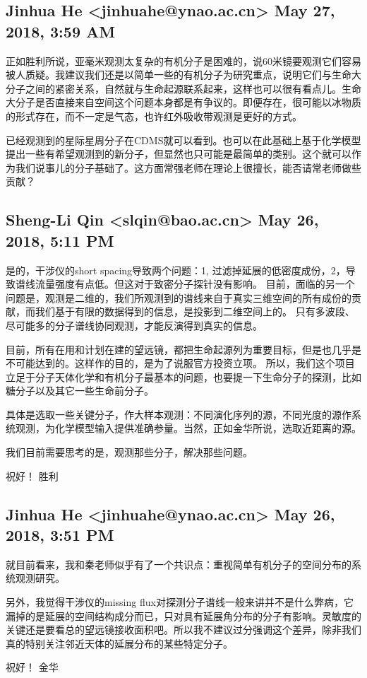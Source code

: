 \documentclass{article}
\newcommand\from[2]{\subsection{{#1} {#2}}}
\newcommand\said[1]{#1}
\begin{document}
\from{
Jinhua He <jinhuahe@ynao.ac.cn>
}{
May 27, 2018, 3:59 AM
}
\said{
正如胜利所说，亚毫米观测太复杂的有机分子是困难的，说60米镜要观测它们容易被人质疑。我建议我们还是以简单一些的有机分子为研究重点，说明它们与生命大分子之间的紧密关系，自然就与生命起源联系起来，这样也可以很有看点儿。生命大分子是否直接来自空间这个问题本身都是有争议的。即便存在，很可能以冰物质的形式存在，而不一定是气态，也许红外吸收带观测是更好的方式。

已经观测到的星际星周分子在CDMS就可以看到。也可以在此基础上基于化学模型提出一些有希望观测到的新分子，但显然也只可能是最简单的类别。这个就可以作为我们说事儿的分子基础了。这方面常强老师在理论上很擅长，能否请常老师做些贡献？
}

\from{
Sheng-Li Qin <slqin@bao.ac.cn>
}{
May 26, 2018, 5:11 PM
}
\said{
是的，干涉仪的short spacing导致两个问题：1, 过滤掉延展的低密度成份，2，导致谱线流量强度有点低。但这对于致密分子探针没有影响。
目前，面临的另一个问题是，观测是二维的，我们所观测到的谱线来自于真实三维空间的所有成份的贡献，而我们基于有限的数据得到的信息，是投影到二维空间上的。 只有多波段、尽可能多的分子谱线协同观测，才能反演得到真实的信息。

目前，所有在用和计划在建的望远镜，都把生命起源列为重要目标，但是也几乎是不可能达到的。这样作的目的，是为了说服官方投资立项。 所以，我们这个项目立足于分子天体化学和有机分子最基本的问题，也要提一下生命分子的探测，比如糖分子以及其它一些生命前分子。

具体是选取一些关键分子，作大样本观测：不同演化序列的源，不同光度的源作系统观测，为化学模型输入提供准确参量。当然，正如金华所说，选取近距离的源。

我们目前需要思考的是，观测那些分子，解决那些问题。

祝好！
胜利}

\from{
Jinhua He <jinhuahe@ynao.ac.cn>
}{
May 26, 2018, 3:51 PM
}
\said{
就目前看来，我和秦老师似乎有了一个共识点：重视简单有机分子的空间分布的系统观测研究。

另外，我觉得干涉仪的missing flux对探测分子谱线一般来讲并不是什么弊病，它漏掉的是延展的空间结构成分而已，只对具有延展角分布的分子有影响。灵敏度的关键还是要看总的望远镜接收面积吧。所以我不建议过分强调这个差异，除非我们真的特别关注邻近天体的延展分布的某些特定分子。

祝好！
金华
}
\end{document}
